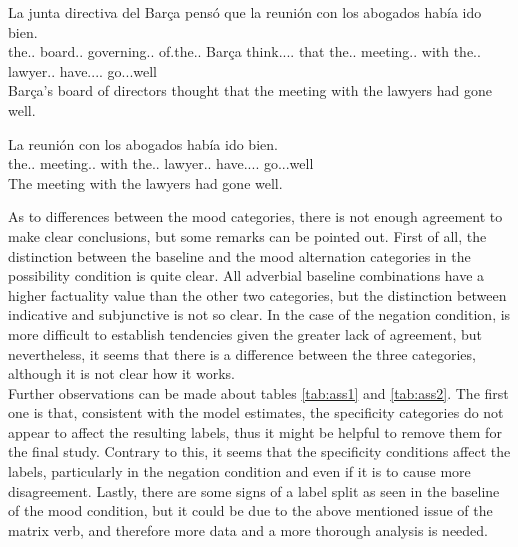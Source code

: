 \begin{exe}
  \ex\label{ex:think}
   \begin{xlist}
    \item{\gll La junta directiva del Barça pensó que la reunión con los abogados había ido bien.\\ the.\F.\Sg{} board.\F.\Sg{} governing.\F.\Sg{} of.the.\M.\Sg{} Barça think.\Pst.\Pfv.\Ind.\Tsg{} that the.\F.\Sg{} meeting.\F.\Sg{} with the.\M.\Pl{} lawyer.\M.\Pl{} have.\Pst.\Ipfv.\Ind.\Tsg{} go.\Ptcp.\M.\Sg{}well \\\glt Barça's board of directors thought that the meeting with the lawyers had gone well.}
      \item{\gll La reunión con los abogados había ido bien.\\ the.\F.\Sg{} meeting.\F.\Sg{} with the.\M.\Pl{} lawyer.\M.\Pl{} have.\Pst.\Ipfv.\Ind.\Tsg{} go.\Ptcp.\M.\Sg{}well \\\glt The meeting with the lawyers had gone well.}\label{ex:hyp2}
    \end{xlist}
\end{exe}

As to differences between the mood categories, there is not enough agreement to make clear conclusions, but some remarks can be pointed out. First of all, the distinction between the baseline and the mood alternation categories in the possibility condition is quite clear. All adverbial baseline combinations have a higher factuality value than the other two categories, but the distinction between indicative and subjunctive is not so clear. In the case of the negation condition, is more difficult to establish tendencies given the greater lack of agreement, but nevertheless, it seems that there is a difference between the three categories, although it is not clear how it works.\\ 

Further observations can be made about tables \ref{tab:ass1} and \ref{tab:ass2}. The first one is that, consistent with the model estimates, the specificity categories do not appear to affect the resulting labels, thus it might be helpful to remove them for the final study. Contrary to this, it seems that the specificity conditions affect the labels, particularly in the negation condition and even if it is to cause more disagreement. Lastly, there are some signs of a label split as seen in the baseline of the mood condition, but it could be due to the above mentioned issue of the matrix verb, and therefore more data and a more thorough analysis is needed.\\ 


